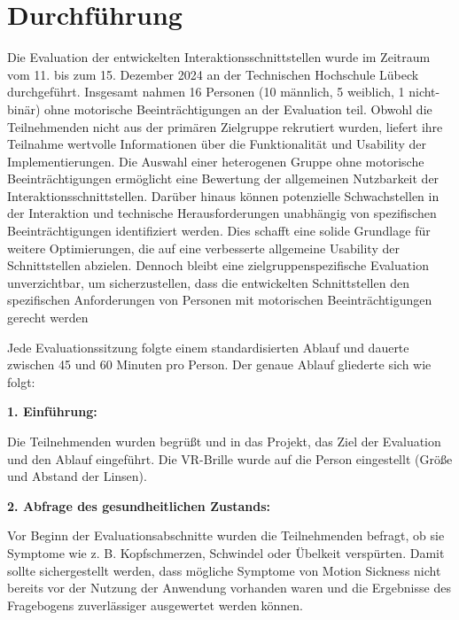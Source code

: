
\section{Durchführung}

Die Evaluation der entwickelten Interaktionsschnittstellen wurde im Zeitraum vom 11. bis zum 15. Dezember 2024 an der Technischen Hochschule Lübeck durchgeführt. Insgesamt nahmen 16 Personen (10 männlich, 5 weiblich, 1 nicht-binär) ohne motorische Beeinträchtigungen an der Evaluation teil. Obwohl die Teilnehmenden nicht aus der primären Zielgruppe rekrutiert wurden, liefert ihre Teilnahme wertvolle Informationen über die Funktionalität und Usability der Implementierungen. Die Auswahl einer heterogenen Gruppe ohne motorische Beeinträchtigungen ermöglicht eine Bewertung der allgemeinen Nutzbarkeit der Interaktionsschnittstellen. Darüber hinaus können potenzielle Schwachstellen in der Interaktion und technische Herausforderungen unabhängig von spezifischen Beeinträchtigungen identifiziert werden. Dies schafft eine solide Grundlage für weitere Optimierungen, die auf eine verbesserte allgemeine Usability der Schnittstellen abzielen. Dennoch bleibt eine zielgruppenspezifische Evaluation unverzichtbar, um sicherzustellen, dass die entwickelten Schnittstellen den spezifischen Anforderungen von Personen mit motorischen Beeinträchtigungen gerecht werden

Jede Evaluationssitzung folgte einem standardisierten Ablauf und dauerte zwischen 45 und 60 Minuten pro Person. Der genaue Ablauf gliederte sich wie folgt:

{\normalfont \bfseries 1. Einführung:}

Die Teilnehmenden wurden begrüßt und in das Projekt, das Ziel der Evaluation und den Ablauf eingeführt. Die VR-Brille wurde auf die Person eingestellt (Größe und Abstand der Linsen). 

{\normalfont \bfseries 2. Abfrage des gesundheitlichen Zustands:}

Vor Beginn der Evaluationsabschnitte wurden die Teilnehmenden befragt, ob sie Symptome wie z. B. Kopfschmerzen, Schwindel oder Übelkeit verspürten. Damit sollte sichergestellt werden, dass mögliche Symptome von Motion Sickness nicht bereits vor der Nutzung der Anwendung vorhanden waren und die Ergebnisse des Fragebogens zuverlässiger ausgewertet werden können. 

